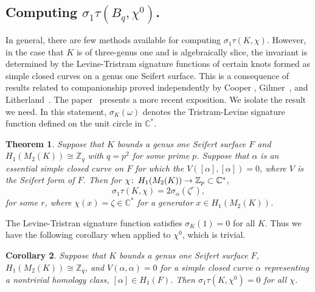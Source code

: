 \documentclass[10pt,oneside]{amsart}
\def\Z{{\mathbb Z}}
\def\C{{\mathbb C}}
\def\co{\colon\thinspace}
\newtheorem{theorem}{Theorem}
\newtheorem{corollary}[theorem]{Corollary}
\theoremstyle{definition}
\begin{document}
\subsection{Computing $\sigma_1 \tau (B_q, \chi^0) $.}

In general, there are few methods available for computing $\sigma_1\tau(K, \chi)$.  However, in the case that $K$ is of three-genus one and is algebraically slice, the invariant is determined by the Levine-Tristram signature functions of certain  knots formed as simple closed curves on a genus one Seifert surface.  This is a consequence of results related to companionship proved independently by Cooper \cite{CooperThesis},   Gilmer~\cite{MR711523}, and Litherland~\cite{MR780587}.  The paper~\cite{MR3096507} presents a more recent exposition.  We isolate the result we need.  In this statement, $\sigma_K(\omega)$ denotes the Tristram-Levine signature function defined on the unit circle in $\C^*$.

\begin{theorem}  Suppose that $K$ bounds a genus one Seifert surface $F$ and $H_1(M_2(K)) \cong \Z_q$ with $q = p^2$ for some prime $p$.   Suppose that  $\alpha$ is an essential simple closed curve on $F$ for which the $V([\alpha] ,[ \alpha]) = 0$, where $V$ is the Seifert form of $F$.   Then for $\chi \co H_1(M_2(K)) \to \Z_p \subset \C^*$, 
\[  \sigma_1 \tau (K, \chi) =    2 \sigma_{\alpha}(\zeta^r), \]
for some $r$, where $\chi(x) = \zeta \in \C^* $ for a generator $x \in H_1(M_2(K))$.
\end{theorem}

The Levine-Tristran signature function satisfies  $\sigma_K(1)  = 0$ for all $K$.  Thus we have the following corollary when applied to $\chi^0$, which  is trivial.

\begin{corollary} \label{cor-zero} Suppose that $K$ bounds a genus one Seifert surface $F$,  $H_1(M_2(K)) \cong \Z_q$, and $V(\alpha, \alpha) = 0 $ for a simple closed curve  $\alpha $ representing a nontrivial homology class, $[\alpha] \in H_1(F)$.  Then $\sigma_1 \tau (K, \chi^0 ) =   0$ for all $\chi$.
\end{corollary}
\end{document}
